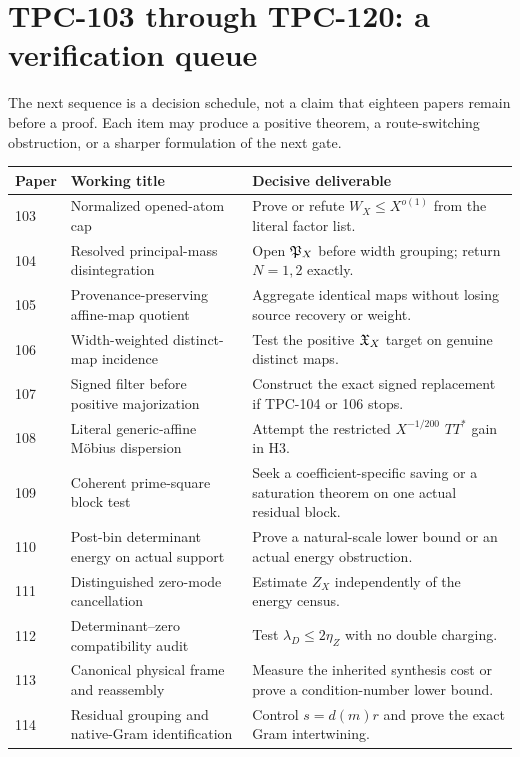 \section{TPC-103 through TPC-120: a verification queue}
\label{sec:queue}

The next sequence is a decision schedule, not a claim that eighteen
papers remain before a proof.  Each item may produce a positive
theorem, a route-switching obstruction, or a sharper formulation of
the next gate.

\begin{table}[ht]
\centering
\small
\begin{tabularx}{\textwidth}{@{}p{1.25cm}p{4.6cm}X@{}}
\toprule
Paper & Working title & Decisive deliverable\\
\midrule
103 & Normalized opened-atom cap &
Prove or refute \(W_X\le X^{o(1)}\) from the literal factor list.\\
104 & Resolved principal-mass disintegration &
Open \(\mathfrak P_X\) before width grouping; return \(N=1,2\) exactly.\\
105 & Provenance-preserving affine-map quotient &
Aggregate identical maps without losing source recovery or weight.\\
106 & Width-weighted distinct-map incidence &
Test the positive \(\mathfrak X_X\) target on genuine distinct maps.\\
107 & Signed filter before positive majorization &
Construct the exact signed replacement if TPC-104 or 106 stops.\\
108 & Literal generic-affine M\"obius dispersion &
Attempt the restricted \(X^{-1/200}\) \(TT^*\) gain in H3.\\
109 & Coherent prime-square block test &
Seek a coefficient-specific saving or a saturation theorem on one
actual residual block.\\
110 & Post-bin determinant energy on actual support &
Prove a natural-scale lower bound or an actual energy obstruction.\\
111 & Distinguished zero-mode cancellation &
Estimate \(Z_X\) independently of the energy census.\\
112 & Determinant--zero compatibility audit &
Test \(\lambda_D\le2\eta_Z\) with no double charging.\\
113 & Canonical physical frame and reassembly &
Measure the inherited synthesis cost or prove a condition-number
lower bound.\\
114 & Residual grouping and native-Gram identification &
Control \(s=d(m)r\) and prove the exact Gram intertwining.\\

\end{tabularx}
\end{table}
